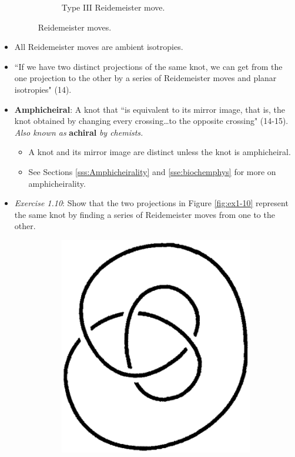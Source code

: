 \documentclass[titlepage]{article}
\numberwithin{figure}{section}
\numberwithin{table}{section}
\numberwithin{equation}{section}
\newcommand{\dq}[2]{``#1" (#2).}
\begin{document}
\begin{itemize}
\begin{figure}[h!]
\begin{subfigure}[b]{0.6\linewidth}
            \caption{Type III Reidemeister move.}
            \label{fig:reidemc}
        \end{subfigure}
        \caption{Reidemeister moves.}
        \label{fig:reidem}
    \end{figure}
    \item All Reidemeister moves are ambient isotropies.
    \item \dq{If we have two distinct projections of the same knot, we can get from the one projection to the other by a series of Reidemeister moves and planar isotropies}{14}
    \item \textbf{Amphicheiral}: A knot that \dq{is equivalent to its mirror image, that is, the knot obtained by changing every crossing\dots to the opposite crossing}{14-15} \emph{Also known as} \textbf{achiral} \emph{by chemists.}
    \begin{itemize}
        \item A knot and its mirror image are distinct unless the knot is amphicheiral.
        \item See Sections \ref{sss:Amphicheirality} and \ref{sse:biochemphys} for more on amphicheirality.
    \end{itemize}
    \newpage
    \item \emph{Exercise 1.10}: Show that the two projections in Figure \ref{fig:ex1-10} represent the same knot by finding a series of Reidemeister moves from one to the other.
    \begin{figure}[h!]
        \centering
        \begin{subfigure}[b]{0.2\linewidth}
            \centering
            \includegraphics[width=0.6\linewidth]{Blender/ex1-10a.png}

\end{subfigure}
\end{figure}
\end{itemize}
\end{document}

